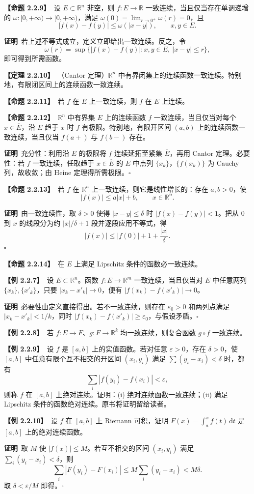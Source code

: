 \documentclass[UTF8,a4paper,11pt]{ctexart}
\newcommand{\ex}[1]{\par\medskip\noindent\textbf{【例 #1】}\ }
\newcommand{\prop}[1]{\par\medskip\noindent\textbf{【命题 #1】}\ }
\newcommand{\thm}[1]{\par\medskip\noindent\textbf{【定理 #1】}\ }
\newcommand{\pf}{\par\noindent\textbf{证明}\ }
\begin{document}
\prop{2.2.9}设 $E\subset\mathbb R^n$ 非空，则 $f:E\to\mathbb R$ 一致连续，当且仅当存在单调递增的 $\omega:[0,+\infty)\to[0,+\infty)$，满足 $\omega(0)=\lim_{r\to0^+}\omega(r)=0$，且
\[
|f(x)-f(y)|\le\omega(|x-y|),\qquad x,y\in E.
\]
\pf 若上述不等式成立，定义立即给出一致连续。反之，令
\[
\omega(r)=\sup\{|f(x)-f(y)|:x,y\in E,\ |x-y|\le r\},
\]
即可得到所需函数。

\thm{2.2.10}（Cantor 定理）$\mathbb R^n$ 中有界闭集上的连续函数一致连续。特别地，有限闭区间上的连续函数一致连续。

\prop{2.2.11}若 $f$ 在 $E$ 上一致连续，则 $f$ 在 $E$ 上连续。

\prop{2.2.12}$\mathbb R^n$ 中有界集 $E$ 上的连续函数 $f$ 一致连续，当且仅当对每个 $x\in\overline E$，沿 $E$ 趋于 $x$ 时 $f$ 有极限。特别地，有限开区间 $(a,b)$ 上的连续函数一致连续，当且仅当 $f(a+)$ 与 $f(b-)$ 存在。
\pf 充分性：利用沿 $E$ 的极限将 $f$ 连续延拓至紧集 $\overline E$，再用 Cantor 定理。必要性：若 $f$ 一致连续，任取趋于 $x\in\overline E$ 的 $E$ 中点列 $\{x_k\}$，$\{f(x_k)\}$ 为 Cauchy 列，故收敛；由 Heine 定理得所需极限。\hfill$\square$

\prop{2.2.13}若 $f$ 在 $\mathbb R^n$ 上一致连续，则它是线性增长的：存在 $a,b>0$，使
\[
|f(x)|\le a|x|+b,\qquad x\in\mathbb R^n.
\]
\pf 由一致连续性，取 $\delta>0$ 使得 $|x-y|\le\delta$ 时 $|f(x)-f(y)|<1$。把从 $0$ 到 $x$ 的线段分为约 $|x|/\delta+1$ 段并逐段应用不等式，得
\[
|f(x)|\le|f(0)|+1+\frac{|x|}{\delta}.
\]\hfill$\square$

\prop{2.2.14}在 $E$ 上满足 Lipschitz 条件的函数必一致连续。

\ex{2.2.7}设 $E\subset\mathbb R^n$。函数 $f:E\to\mathbb R^m$ 一致连续，当且仅当对 $E$ 中任意两列 $\{x_k\},\{x'_k\}$，只要 $|x_k-x'_k|\to0$，便有 $|f(x_k)-f(x'_k)|\to0$。
\pf 必要性由定义直接得出。若不一致连续，则存在 $\varepsilon_0>0$ 和两列点满足 $|x_k-x'_k|<1/k$，同时 $|f(x_k)-f(x'_k)|\ge\varepsilon_0$，与假设矛盾。\hfill$\square$

\ex{2.2.8}若 $f:E\to F$、$g:F\to\mathbb R^k$ 均一致连续，则复合函数 $g\circ f$ 一致连续。

\ex{2.2.9}设 $f$ 是 $[a,b]$ 上的实值函数。若对任意 $\varepsilon>0$，存在 $\delta>0$，使 $[a,b]$ 中任意有限个互不相交的开区间 $(x_i,y_i)$ 满足 $\sum(y_i-x_i)<\delta$ 时，都有
\[
\sum_i|f(y_i)-f(x_i)|<\varepsilon,
\]
则称 $f$ 在 $[a,b]$ 上绝对连续。证明：(i) 绝对连续函数一致连续；(ii) 满足 Lipschitz 条件的函数绝对连续。原书将证明留给读者。

\ex{2.2.10}设 $f$ 在 $[a,b]$ 上 Riemann 可积，证明 $F(x)=\int_a^x f(t)\,\mathrm dt$ 是 $[a,b]$ 上的绝对连续函数。
\pf 取 $M$ 使 $|f(x)|\le M$。若互不相交的区间 $(x_i,y_i)$ 满足 $\sum_i(y_i-x_i)<\delta$，则
\[
\sum_i|F(y_i)-F(x_i)|
\le M\sum_i(y_i-x_i)<M\delta.
\]
取 $\delta<\varepsilon/M$ 即得。\hfill$\square$
\end{document}
